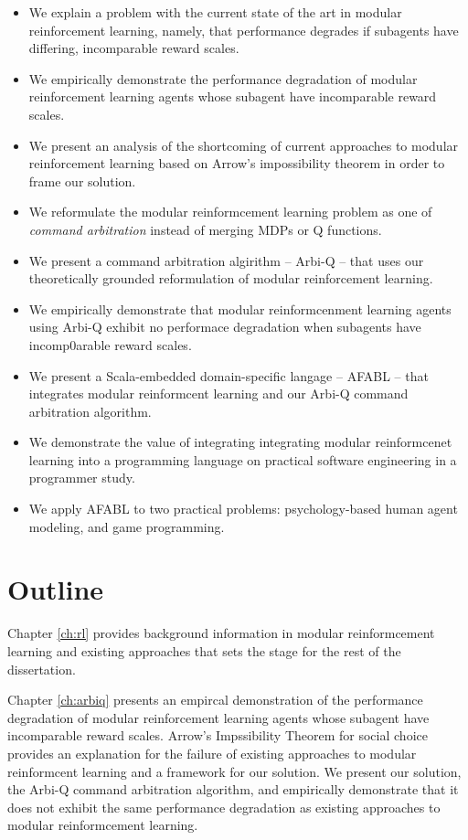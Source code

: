 \begin{itemize}
\item We explain a problem with the current state of the art in modular reinforcement learning, namely, that performance degrades if subagents have differing, incomparable reward scales.
\item We empirically demonstrate the performance degradation of modular reinforcement learning agents whose subagent have incomparable reward scales.
\item We present an analysis of the shortcoming of current approaches to modular reinforcement learning based on Arrow's impossibility theorem in order to frame our solution.
\item We reformulate the modular reinformcement learning problem as one of {\it command arbitration} instead of merging MDPs or Q functions.
\item We present a command arbitration algirithm -- Arbi-Q -- that uses our theoretically grounded reformulation of modular reinforcement learning.
\item We empirically demonstrate that modular reinformcenment learning agents using Arbi-Q exhibit no performace degradation when subagents have incomp0arable reward scales.
\item We present a Scala-embedded domain-specific langage -- AFABL -- that integrates modular reinformcent learning and our Arbi-Q command arbitration algorithm.
\item We demonstrate the value of integrating integrating modular reinformcenet learning into a programming language on practical software engineering in a programmer study.
\item We apply AFABL to two practical problems: psychology-based human agent modeling, and game programming.
\end{itemize}

\section{Outline}

Chapter \ref{ch:rl} provides background information in modular reinformcement learning and existing approaches that sets the stage for the rest of the dissertation.

Chapter \ref{ch:arbiq} presents an empircal demonstration of the performance degradation of modular reinforcement learning agents whose subagent have incomparable reward scales. Arrow's Impssibility Theorem for social choice provides an explanation for the failure of existing approaches to modular reinformcent learning and a framework for our solution. We present our solution, the Arbi-Q command arbitration algorithm, and empirically demonstrate that it does not exhibit the same performance degradation as existing approaches to modular reinformcement learning.

